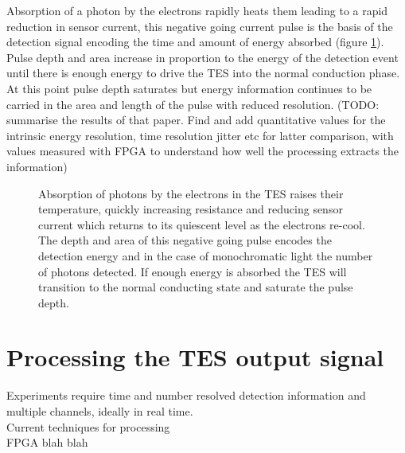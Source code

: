\documentclass{article}
\begin{document}
Absorption of a photon by the electrons rapidly heats them leading to a rapid
reduction in sensor current, this negative going current pulse is the basis of
the detection signal encoding the time and amount of energy absorbed (figure
\ref{fig:detection}).
Pulse depth and area increase in proportion to the energy of the detection event
until there is enough energy to drive the TES into the normal conduction phase.
At this point pulse depth saturates but energy information continues to be
carried in the area and length of the pulse with
reduced resolution\cite{2014JOSAB..31B..20L}.
(TODO: summarise the results of that paper.  Find and add quantitative values
for the intrinsic energy resolution, time resolution jitter etc for latter
comparison, with values measured with FPGA to understand how well the processing
extracts the information)


\begin{figure}[!hpbt]
\centering 
  
  \caption{
    Absorption of photons by the electrons in the TES raises their temperature,
    quickly increasing resistance and reducing sensor current which returns to
    its quiescent level as the electrons re-cool.
    The depth and area of this negative going pulse encodes the detection
    energy and in the case of monochromatic light the number of photons
    detected.
    If enough energy is absorbed the TES will transition to the normal
    conducting state and saturate the pulse depth.
  }
  \label{fig:detection}
\end{figure}


% 
% 
% 
\clearpage

\section{Processing the TES output signal}
Experiments require time and number resolved detection information and 
multiple channels, ideally in real time. \\
Current techniques for processing \\
FPGA blah blah \\
\end{document}

